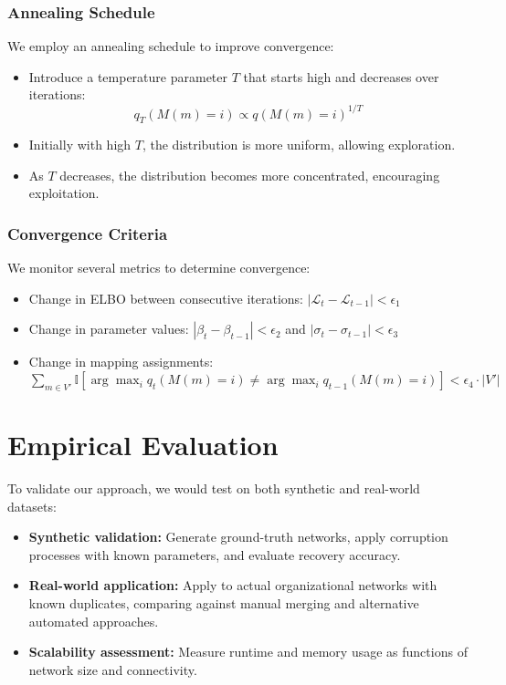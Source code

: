\documentclass[12pt]{article}
\begin{document}
\subsubsection{Annealing Schedule}
We employ an annealing schedule to improve convergence:

\begin{itemize}
\item Introduce a temperature parameter $T$ that starts high and decreases over iterations:
$$q_T(M(m) = i) \propto q(M(m) = i)^{1/T}$$
\item Initially with high $T$, the distribution is more uniform, allowing exploration.
\item As $T$ decreases, the distribution becomes more concentrated, encouraging exploitation.
\end{itemize}

\subsubsection{Convergence Criteria}
We monitor several metrics to determine convergence:

\begin{itemize}
\item Change in ELBO between consecutive iterations: $|\mathcal{L}_t - \mathcal{L}_{t-1}| < \epsilon_1$
\item Change in parameter values: $|\beta_t - \beta_{t-1}| < \epsilon_2$ and $|\sigma_t - \sigma_{t-1}| < \epsilon_3$
\item Change in mapping assignments: $\sum_{m \in V'} \mathbb{I}[\arg\max_i q_t(M(m)=i) \neq \arg\max_i q_{t-1}(M(m)=i)] < \epsilon_4 \cdot |V'|$
\end{itemize}

\section{Empirical Evaluation}
To validate our approach, we would test on both synthetic and real-world datasets:

\begin{itemize}
\item \textbf{Synthetic validation:} Generate ground-truth networks, apply corruption processes with known parameters, and evaluate recovery accuracy.
\item \textbf{Real-world application:} Apply to actual organizational networks with known duplicates, comparing against manual merging and alternative automated approaches.
\item \textbf{Scalability assessment:} Measure runtime and memory usage as functions of network size and connectivity.
\end{itemize}
\end{document}
